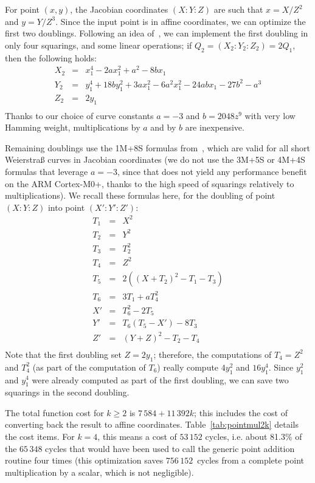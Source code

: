 \documentclass{llncs}
\begin{document}
For point $(x,y)$, the Jacobian coordinates $(X{:}Y{:}Z)$ are such that
$x = X/Z^2$ and $y = Y/Z^3$. Since the input point is in affine
coordinates, we can optimize the first two doublings. Following an idea
of~\cite{LeNgu2012}, we can implement the first doubling in only four
squarings, and some linear operations; if $Q_2 = (X_2{:}Y_2{:}Z_2) =
2Q_1$, then the following holds:
\begin{eqnarray*}
    X_2 &=& x_1^4 - 2 a x_1^2 + a^2 - 8 b x_1 \\
    Y_2 &=& y_1^4 + 18 b y_1^2 + 3 a x_1^2 - 6 a^2 x_1^2 - 24 a b x_1
            - 27 b^2 - a^3 \\
    Z_2 &=& 2 y_1 \\
\end{eqnarray*}
Thanks to our choice of curve constants $a = -3$ and $b = 2048z^9$ with
very low Hamming weight, multiplications by $a$ and by $b$ are
inexpensive.

Remaining doublings use the 1M+8S formulas from~\cite{EFD}, which are
valid for all short Weierstraß curves in Jacobian coordinates (we do not
use the 3M+5S or 4M+4S formulas that leverage $a = -3$, since that does
not yield any performance benefit on the ARM Cortex-M0+, thanks to the
high speed of squarings relatively to multiplications). We recall these
formulas here, for the doubling of point $(X{:}Y{:}Z)$ into point
$(X'{:}Y'{:}Z')$:
\begin{eqnarray*}
    T_1 &=& X^2 \\
    T_2 &=& Y^2 \\
    T_3 &=& T_2^2 \\
    T_4 &=& Z^2 \\
    T_5 &=& 2((X+T_2)^2 - T_1 - T_3) \\
    T_6 &=& 3T_1 + aT_4^2 \\
     X' &=& T_6^2 - 2T_5 \\
     Y' &=& T_6(T_5 - X') - 8T_3 \\
     Z' &=& (Y+Z)^2 - T_2 - T_4 \\
\end{eqnarray*}
Note that the first doubling set $Z = 2y_1$; therefore, the computations
of $T_4 = Z^2$ and $T_4^2$ (as part of the computation of $T_6$) really
compute $4y_1^2$ and $16y_1^4$. Since $y_1^2$ and $y_1^4$ were already
computed as part of the first doubling, we can save two squarings in the
second doubling.

The total function cost for $k\geq 2$ is $7\,584 + 11\,392k$; this
includes the cost of converting back the result to affine coordinates.
Table~\ref{tab:pointmul2k} details the cost items. For $k = 4$, this
means a cost of $53\,152$ cycles, i.e. about 81.3\% of the $65\,348$
cycles that would have been used to call the generic point addition
routine four times (this optimization saves $756\,152$~cycles from a
complete point multiplication by a scalar, which is not negligible).
\end{document}
